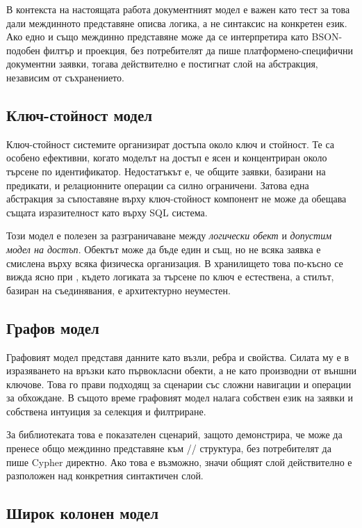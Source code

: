В контекста на настоящата работа документният модел е важен като тест за това дали междинното представяне описва логика, а не синтаксис на конкретен език. Ако едно и също междинно представяне може да се интерпретира като BSON-подобен филтър и проекция, без потребителят да пише платформено-специфични документни заявки, тогава действително е постигнат слой на абстракция, независим от съхранението.

\subsection{Ключ-стойност модел}

Ключ-стойност системите организират достъпа около ключ и стойност. Те са особено ефективни, когато моделът на достъп е ясен и концентриран около търсене по идентификатор. Недостатъкът е, че общите заявки, базирани на предикати, и релационните операции са силно ограничени. Затова една абстракция за съпоставяне върху ключ-стойност компонент не може да обещава същата изразителност като върху SQL система.

Този модел е полезен за разграничаване между \emph{логически обект} и \emph{допустим модел на достъп}. Обектът може да бъде един и същ, но не всяка заявка е смислена върху всяка физическа организация. В хранилището това по-късно се вижда ясно при , където логиката за търсене по ключ е естествена, а стилът, базиран на съединявания, е архитектурно неуместен.

\subsection{Графов модел}

Графовият модел представя данните като възли, ребра и свойства. Силата му е в изразяването на връзки като първокласни обекти, а не като производни от външни ключове. Това го прави подходящ за сценарии със сложни навигации и операции за обхождане. В същото време графовият модел налага собствен език на заявки и собствена интуиция за селекция и филтриране.

За библиотеката това е показателен сценарий, защото демонстрира, че  може да пренесе общо междинно представяне към // структура, без потребителят да пише Cypher директно. Ако това е възможно, значи общият слой действително е разположен над конкретния синтактичен слой.

\subsection{Широк колонен модел}

